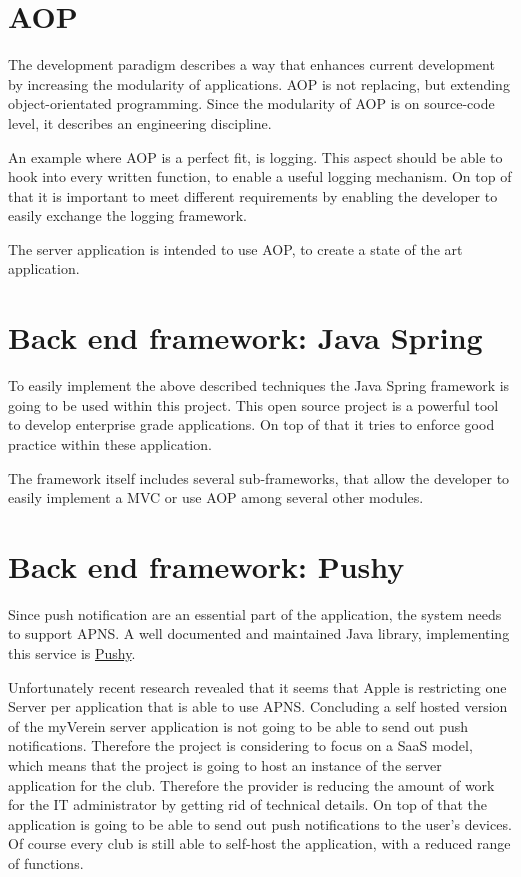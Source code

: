 \section{\acrfull{AOP}}
The development paradigm describes a way that enhances current development by increasing the modularity of applications. \acrshort{AOP} is not replacing, but extending object-orientated programming. Since the modularity of \acrshort{AOP} is on source-code level, it describes an engineering discipline.

An example where \acrlong{AOP} is a perfect fit, is logging. This aspect should be able to hook into every written function, to enable a useful logging mechanism. On top of that it is important to meet different requirements by enabling the developer to easily exchange the logging framework.

The server application is intended to use \acrlong{AOP}, to create a state of the art application.

\section{Back end framework: Java Spring}
To easily implement the above described techniques the Java Spring framework is going to be used within this project. This open source project is a powerful tool to develop enterprise grade applications. On top of that it tries to enforce good practice within these application.

The framework itself includes several sub-frameworks, that allow the developer to easily implement a \acrlong{MVC} or use \acrlong{AOP} among several other modules.

\section{Back end framework: Pushy}
Since push notification are an essential part of the application, the system needs to support \acrfull{APNS}. A well documented and maintained Java library, implementing this service is \href{http://relayrides.github.io/pushy/}{Pushy}. 

Unfortunately recent research revealed that it seems that Apple is restricting one Server per application that is able to use \acrshort{APNS}. Concluding a self hosted version of the myVerein server application is not going to be able to send out push notifications. Therefore the project is considering to focus on a \acrfull{SaaS} model, which means that the project is going to host an instance of the server application for the club. Therefore the provider is reducing the amount of work for the IT administrator by getting rid of technical details. On top of that the application is going to be able to send out push notifications to the user's devices. Of course every club is still able to self-host the application, with a reduced range of functions.

